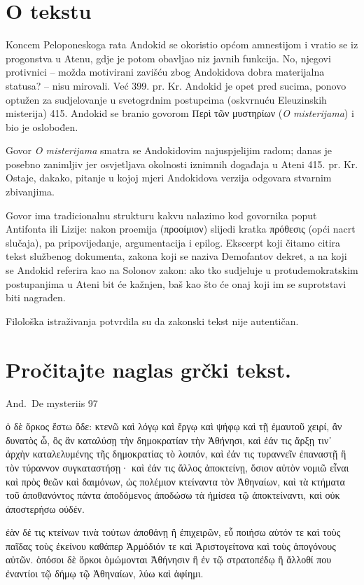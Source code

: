 \section*{O tekstu}

Koncem Peloponeskoga rata Andokid se okoristio općom amnestijom i vratio se iz progonstva u Atenu, gdje je potom obavljao niz javnih funkcija. No, njegovi protivnici – možda motivirani zavišću zbog Andokidova dobra materijalna statusa? – nisu mirovali. Već 399. pr. Kr. Andokid je opet pred sucima, ponovo optužen za sudjelovanje u svetogrdnim postupcima (oskvrnuću Eleuzinskih misterija) 415. Andokid se branio govorom \textgreek[variant=ancient]{Περὶ τῶν μυστηρίων} (\textit{O misterijama}) i bio je oslobođen.

Govor \textit{O misterijama} smatra se Andokidovim najuspjelijim radom; danas je posebno zanimljiv jer osvjetljava okolnosti iznimnih događaja u Ateni 415. pr. Kr. Ostaje, dakako, pitanje u kojoj mjeri Andokidova verzija odgovara stvarnim zbivanjima.

Govor ima tradicionalnu strukturu kakvu nalazimo kod govornika poput Antifonta ili Lizije: nakon proemija (προοίμιον) slijedi kratka πρόθεσις (opći nacrt slučaja), pa pripovijedanje, argumentacija i epilog. Ekscerpt koji čitamo citira tekst službenog dokumenta, zakona koji se naziva Demofantov dekret, a na koji se Andokid referira kao na Solonov zakon: ako tko sudjeluje u protudemokratskim postupanjima u Ateni bit će kažnjen, baš kao što će onaj koji im se suprotstavi biti nagrađen.

Filološka istraživanja potvrdila su da zakonski tekst nije autentičan.



\newpage

\section*{Pročitajte naglas grčki tekst.}

And.\ De mysteriis 97


\medskip


{\large

\begin{greek}

\noindent ὁ δὲ ὅρκος ἔστω ὅδε: κτενῶ καὶ λόγῳ καὶ ἔργῳ καὶ ψήφῳ καὶ τῇ ἐμαυτοῦ χειρί, ἂν δυνατὸς ὦ, ὃς ἂν καταλύσῃ τὴν δημοκρατίαν τὴν Ἀθήνησι, καὶ ἐάν τις ἄρξῃ τιν᾽ ἀρχὴν καταλελυμένης τῆς δημοκρατίας τὸ λοιπόν, καὶ ἐάν τις τυραννεῖν ἐπαναστῇ ἢ τὸν τύραννον συγκαταστήσῃ· καὶ ἐάν τις ἄλλος ἀποκτείνῃ, ὅσιον αὐτὸν νομιῶ εἶναι καὶ πρὸς θεῶν καὶ δαιμόνων, ὡς πολέμιον κτείναντα τὸν Ἀθηναίων, καὶ τὰ κτήματα τοῦ ἀποθανόντος πάντα ἀποδόμενος ἀποδώσω τὰ ἡμίσεα τῷ ἀποκτείναντι, καὶ οὐκ ἀποστερήσω οὐδέν.

ἐὰν δέ τις κτείνων τινὰ τούτων ἀποθάνῃ ἢ ἐπιχειρῶν, εὖ ποιήσω αὐτόν τε καὶ τοὺς παῖδας τοὺς ἐκείνου καθάπερ Ἁρμόδιόν τε καὶ Ἀριστογείτονα καὶ τοὺς ἀπογόνους αὐτῶν. ὁπόσοι δὲ ὅρκοι ὀμώμονται Ἀθήνησιν ἢ ἐν τῷ στρατοπέδῳ ἢ ἄλλοθί που ἐναντίοι τῷ δήμῳ τῷ Ἀθηναίων, λύω καὶ ἀφίημι.

\end{greek}

}


